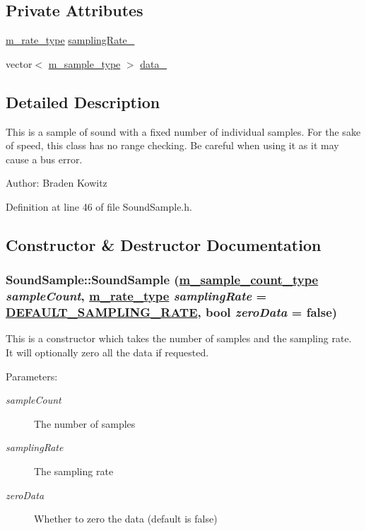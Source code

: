 \subsection*{Private Attributes}
\begin{CompactItemize}
\item 
\hyperlink{Types_8h_a4}{m\_\-rate\_\-type} \hyperlink{classSoundSample_r0}{sampling\-Rate\_\-}
\item 
vector$<$ \hyperlink{Types_8h_a0}{m\_\-sample\_\-type} $>$ \hyperlink{classSoundSample_r1}{data\_\-}
\end{CompactItemize}


\subsection{Detailed Description}
This is a sample of sound with a fixed number of individual samples. For the sake of speed, this class has no range checking. Be careful when using it as it may cause a bus error. \begin{Desc}
\item[Author:]Braden Kowitz \end{Desc}




Definition at line 46 of file Sound\-Sample.h.

\subsection{Constructor \& Destructor Documentation}
\hypertarget{classSoundSample_a0}{
\subsubsection[SoundSample]{\setlength{\rightskip}{0pt plus 5cm}Sound\-Sample::Sound\-Sample (\hyperlink{Types_8h_a1}{m\_\-sample\_\-count\_\-type} {\em sample\-Count}, \hyperlink{Types_8h_a4}{m\_\-rate\_\-type} {\em sampling\-Rate} = \hyperlink{Types_8h_a5}{DEFAULT\_\-SAMPLING\_\-RATE}, bool {\em zero\-Data} = false)}}
\label{classSoundSample_a0}


This is a constructor which takes the number of samples and the sampling rate. It will optionally zero all the data if requested. \begin{Desc}
\item[Parameters:]
\begin{description}
\item[{\em sample\-Count}]The number of samples \item[{\em sampling\-Rate}]The sampling rate \item[{\em zero\-Data}]Whether to zero the data (default is false) \end{description}
\end{Desc}


